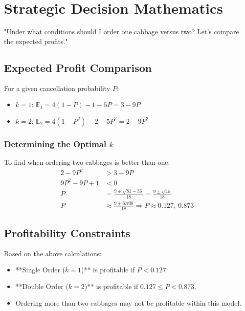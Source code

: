 \documentclass[11pt]{article}
\begin{document}
\section*{Strategic Decision Mathematics}
\begin{thoughtbox}
"Under what conditions should I order one cabbage versus two? Let's compare the expected profits."
\end{thoughtbox}

\subsection*{Expected Profit Comparison}
For a given cancellation probability \( P \):
\begin{itemize}[label=\color{DarkSlateBlue}\textbullet]
  \item \( k=1 \): \(\mathbb{E}_1 = 4(1-P) - 1 - 5P = 3 - 9P\)
  \item \( k=2 \): \(\mathbb{E}_2 = 4(1-P^2) - 2 - 5P^2 = 2 - 9P^2\)
\end{itemize}

\begin{strategybox}
\subsubsection*{Determining the Optimal \( k \)}
To find when ordering two cabbages is better than one:
\begin{align*}
2 - 9P^2 &> 3 - 9P \\
9P^2 - 9P + 1 &< 0 \\
P &= \frac{9 \pm \sqrt{81 - 36}}{18} = \frac{9 \pm \sqrt{45}}{18} \\
P &\approx \frac{9 \pm 6.708}{18} \Rightarrow P \approx 0.127,\ 0.873
\end{align*}
\end{strategybox}

\subsection*{Profitability Constraints}
Based on the above calculations:
\begin{itemize}[label=\color{DarkSlateBlue}\textbullet]
  \item **Single Order (\( k=1 \))** is profitable if \( P < 0.127 \).
  \item **Double Order (\( k=2 \))** is profitable if \( 0.127 \leq P < 0.873 \).
  \item Ordering more than two cabbages may not be profitable within this model.
\end{itemize}
\end{document}
